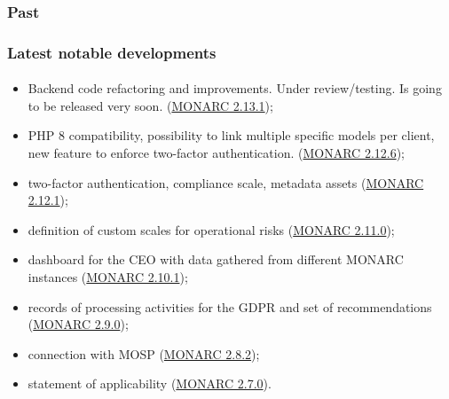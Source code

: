 \subsubsection{Past}
\begin{frame}
  \frametitle{Latest notable developments}
  \framesubtitle{}
  \begin{itemize}
    \item Backend code refactoring and improvements. Under review/testing. Is going to be released very soon.
      (\href{https://github.com/monarc-project/zm-client/pull/73}{MONARC 2.13.1});
    \item PHP 8 compatibility, possibility to link multiple specific models per client,
          new feature to enforce two-factor authentication.
      (\href{https://www.monarc.lu/news/2023/04/25/monarc-2126-released/}{MONARC 2.12.6});
    \item two-factor authentication, compliance scale, metadata assets
      (\href{https://www.monarc.lu/news/2022/06/22/monarc-2121-released/}{MONARC 2.12.1});
    \item definition of custom scales for operational risks
      (\href{https://www.monarc.lu/news/2021/09/02/monarc-2110-released/}{MONARC 2.11.0});
    \item dashboard for the CEO with data gathered from different MONARC instances
      (\href{https://www.monarc.lu/news/2020/12/18/monarc-2101-released/}{MONARC 2.10.1});
    \item records of processing activities for the GDPR and set of recommendations
      (\href{https://www.monarc.lu/news/2019/08/23/monarc-290-released/}{MONARC 2.9.0});
    \item connection with MOSP
      (\href{https://www.monarc.lu/news/2019/05/28/monarc-282-released/}{MONARC 2.8.2});
    \item statement of applicability
      (\href{https://www.monarc.lu/news/2018/08/22/monarc-270-released/}{MONARC 2.7.0}).
  \end{itemize}
\end{frame}

